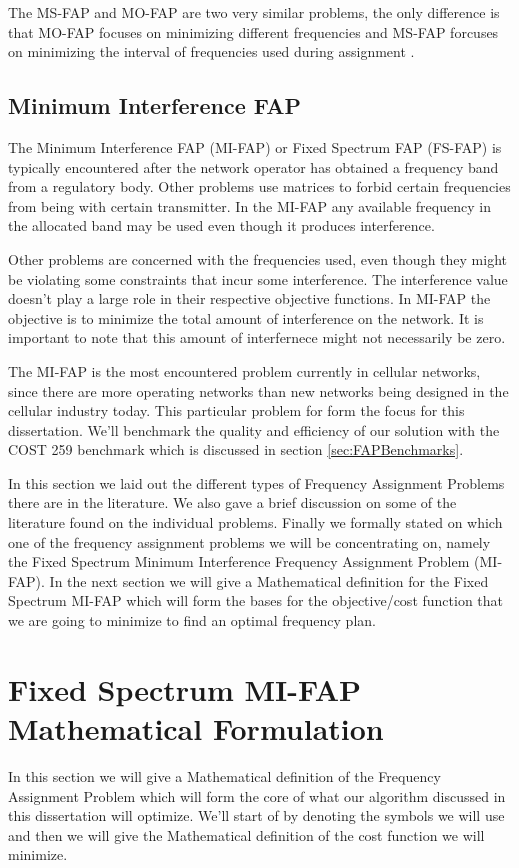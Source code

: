 The MS-FAP and MO-FAP are two very similar problems, the only difference is that MO-FAP focuses on minimizing different frequencies and MS-FAP forcuses on minimizing the interval of frequencies used during assignment \cite{Karen2004}.
\subsection{Minimum Interference FAP}
The Minimum Interference FAP (MI-FAP) or Fixed Spectrum FAP (FS-FAP) is typically encountered after the network operator has obtained a frequency band from a regulatory body. Other problems use matrices to forbid certain frequencies from being with certain transmitter. In the MI-FAP any available frequency in the allocated band may be used even though it produces interference. 

Other problems are concerned with the frequencies used, even though they might be violating some constraints that incur some interference. The interference value doesn't play a large role in their respective objective functions. In MI-FAP the objective is to minimize the total amount of interference on the network. It is important to note that this amount of interfernece might not necessarily be zero.

The MI-FAP is the most encountered problem currently in cellular networks, since there are more operating networks than new networks being designed in the cellular industry today. This particular problem for form the focus for this dissertation. We'll benchmark the quality and efficiency of our solution with the COST 259 benchmark which is discussed in section \ref{sec:FAPBenchmarks}.

In this section we laid out the different types of Frequency Assignment Problems there are in the literature. We also gave a brief discussion on some of the literature found on the individual problems. Finally we formally stated on which one of the frequency assignment problems we will be concentrating on, namely the Fixed Spectrum Minimum Interference Frequency Assignment Problem (MI-FAP). In the next section we will give a Mathematical definition for the Fixed Spectrum MI-FAP which will form the bases for the objective/cost function that we are going to minimize to find an optimal frequency plan.
\section{Fixed Spectrum MI-FAP Mathematical Formulation}
In this section we will give a Mathematical definition of the Frequency Assignment Problem which will form the core of what our algorithm discussed in this dissertation will optimize. We'll start of by denoting the symbols we will use and then we will give the Mathematical definition of the cost function we will minimize.

